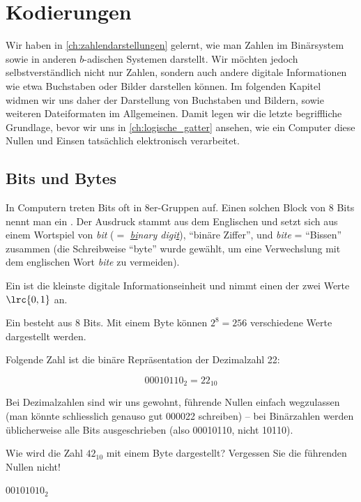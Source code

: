 \chapter{Kodierungen}\label{ch:kodierungen}

Wir haben in \cref{ch:zahlendarstellungen} gelernt, wie man Zahlen im Binärsystem sowie in anderen $b$-adischen Systemen darstellt. Wir möchten jedoch selbstverständlich nicht nur Zahlen, sondern auch andere digitale Informationen wie etwa Buchstaben oder Bilder darstellen können. Im folgenden Kapitel widmen wir uns daher der Darstellung von Buchstaben und Bildern, sowie weiteren Dateiformaten im Allgemeinen. Damit legen wir die letzte begriffliche Grundlage, bevor wir uns in \cref{ch:logische_gatter} ansehen, wie ein Computer diese Nullen und Einsen tatsächlich elektronisch verarbeitet.

\section{Bits und Bytes}
In Computern treten Bits oft in 8er-Gruppen auf. Einen solchen Block von 8 Bits nennt man ein . Der Ausdruck stammt aus dem Englischen und setzt sich aus einem Wortspiel von \textit{bit} ($=$ \textit{\underline{bi}nary digi\underline{t}}), \enquote{binäre Ziffer}, und \textit{bite} = \enquote{Bissen} zusammen (die Schreibweise \enquote{byte} wurde gewählt, um eine Verwechslung mit dem englischen Wort \textit{bite} zu vermeiden).

\begin{mydefinition}\label{mydefinition:bit-byte}
	Ein  ist die kleinste digitale Informationseinheit und nimmt einen der zwei Werte $\lrc{0,1}$ an.

	Ein  besteht aus $8$ Bits. Mit einem Byte können $2^8 = 256$ verschiedene Werte dargestellt werden.
\end{mydefinition}

Folgende Zahl ist die binäre Repräsentation der Dezimalzahl 22:

\[00010110_2 = 22_{10}\]

Bei Dezimalzahlen sind wir uns gewohnt, führende Nullen einfach wegzulassen (man könnte schliesslich genauso gut 000022 schreiben) -- bei Binärzahlen werden üblicherweise alle Bits ausgeschrieben (also 00010110, nicht 10110).

\begin{myexercise}
	Wie wird die Zahl $42_{10}$ mit einem Byte dargestellt? Vergessen Sie die führenden Nullen nicht!
	\begin{myanswer}
		$00101010_2$
	\end{myanswer}
\end{myexercise}

